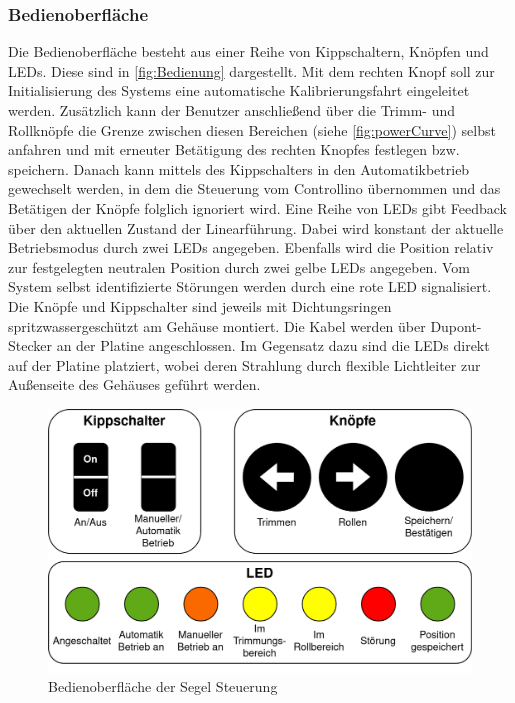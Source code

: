 \subsubsection{Bedienoberfläche}
\noindent Die Bedienoberfläche besteht aus einer Reihe von Kippschaltern, Knöpfen und \ac{LED}s. Diese sind in \autoref{fig:Bedienung} dargestellt. Mit dem rechten Knopf soll zur Initialisierung des Systems eine automatische Kalibrierungsfahrt eingeleitet werden. Zusätzlich kann der Benutzer anschließend über die Trimm- und Rollknöpfe die Grenze zwischen diesen Bereichen (siehe \autoref{fig:powerCurve}) selbst anfahren und mit erneuter Betätigung des rechten Knopfes festlegen bzw. speichern. Danach kann mittels des Kippschalters in den Automatikbetrieb gewechselt werden, in dem die Steuerung vom Controllino übernommen und das Betätigen der Knöpfe folglich ignoriert wird.
Eine Reihe von LEDs gibt Feedback über den aktuellen Zustand der Linearführung. Dabei wird konstant der aktuelle Betriebsmodus durch zwei LEDs angegeben. Ebenfalls wird die Position relativ zur festgelegten neutralen Position durch zwei gelbe LEDs angegeben. Vom System selbst identifizierte Störungen werden durch eine rote LED signalisiert.\\
Die Knöpfe und Kippschalter sind jeweils mit Dichtungsringen spritzwassergeschützt am Gehäuse montiert. Die Kabel werden über Dupont-Stecker an der Platine angeschlossen. Im Gegensatz dazu sind die LEDs direkt auf der Platine platziert, wobei deren Strahlung durch flexible Lichtleiter zur Außenseite des Gehäuses geführt werden.
\begin{figure}[H]
	\centering
	\includegraphics[width=1.0\textwidth]{images/Hardware/Bedienung.drawio.png}
	\caption{Bedienoberfläche der Segel Steuerung}
	\label{fig:Bedienung}
\end{figure}
